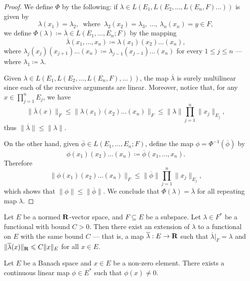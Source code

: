 \begin{proof}
    We define \(\Phi\) by the following: if \(\lambda \in L(E_1, L(E_2, \dots,
    L(E_n, F) \dots))\) is given by
    \[
        \lambda(x_1) = \lambda_2,\ \text{ where }\ \lambda_2(x_2) = \lambda_3, \
        \dots, \ \lambda_n(x_n) = y \in F,
    \]
    we define \(\Phi(\lambda) \coloneq \overline{\lambda} \in L(E_1, \dots, E_n;
    F)\) by the mapping
    \[
        \overline\lambda(x_1, \dots, x_n) \coloneq \lambda(x_1)(x_2) \dots (x_n),
    \]
    where \(\lambda_j(x_j)(x_{j+1}) \dots (x_n) \coloneq \lambda_{j-1}(x_{j-1})
    \dots (x_n)\) for every \(1 \leq j \leq n\) --- where \(\lambda_1 \coloneq
    \lambda\).

    Given \(\lambda \in L(E_1, L(E_2, \dots, L(E_n, F), \dots))\), the map
    \(\overline\lambda\) is surely multilinear since each of the recursive arguments
    are linear. Moreover, notice that, for any \(x \in \prod_{j=1}^n E_j\), we have
    \[
        \|\overline\lambda(x)\|_{F}
        \leq \|\lambda(x_1) (x_2) \dots (x_n)\|_F
        \leq \|\lambda\| \prod_{j=1}^n \|x_{j}\|_{E_j},
    \]
    thus \(\|\overline\lambda\| \leq \|\lambda\|\).

    On the other hand, given \(\overline\phi \in L(E_1, \dots, E_n; F)\), define the
    map \(\phi = \Phi^{-1}(\overline\phi)\) by
    \[
        \phi(x_1)(x_2) \dots (x_n) \coloneq \overline\phi(x_1, \dots, x_n).
    \]
    Therefore
    \[
        \|\phi(x_1)(x_2) \dots (x_n)\|_{F}
        \leq \|\overline\phi\| \prod_{j=1}^n \|x_j\|_{E_j},
    \]
    which shows that \(\|\phi\| \leq \|\overline\phi\|\). We conclude that
    \(\Phi(\lambda) = \overline\lambda\) for all repeating map \(\lambda\).
\end{proof}

\begin{theorem}
    \label{thm:Hahn-Banach}
    Let \(E\) be a normed \(\mathbf{R}\)-vector space, and \(F \subseteq E\) be a
    subspace. Let \(\lambda \in F^{*}\) be a functional with bound \(C > 0\). Then
    there exist an extension of \(\lambda\) to a functional on \(E\) with the same
    bound \(C\) --- that is, a map \(\overline \lambda: E \to \mathbf{R}\) such that
    \(\overline\lambda|_F = \lambda\) and \(\|\overline\lambda(x)\|_{\mathbf{R}} \leqslant C
    \|x\|_{E}\) for all \(x \in E\).
\end{theorem}

\begin{corollary}
    \label{cor:Hahn-Banach}
    Let \(E\) be a Banach space and \(x \in E\) be a non-zero element. There exists
    a continuous linear map \(\phi \in E^{*}\) such that \(\phi(x) \neq 0\).
\end{corollary}

